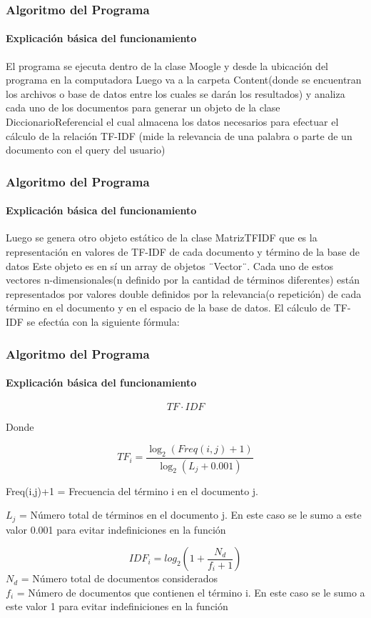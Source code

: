 \documentclass{beamer}
\begin{document}
\begin{frame}
\frametitle{Algoritmo del Programa}
\framesubtitle{Explicación básica del funcionamiento}
El programa se ejecuta dentro de la clase Moogle y desde la ubicación del programa en la computadora
Luego va a la carpeta Content(donde se encuentran los archivos o base de datos entre los cuales se darán los resultados) y analiza cada uno de los documentos para generar un objeto de la clase DiccionarioReferencial el cual almacena los datos necesarios para efectuar el cálculo de la relación TF-IDF (mide la relevancia de una palabra o parte de un documento con el query del usuario)
\end{frame}

\begin{frame}
\frametitle{Algoritmo del Programa}
\framesubtitle{Explicación básica del funcionamiento}
Luego se genera otro objeto estático de la clase MatrizTFIDF que es la representación en valores de TF-IDF de cada documento y término de la base de datos
Este objeto es en sí un array de objetos ¨Vector¨. Cada uno de estos vectores n-dimensionales(n definido por la cantidad de términos diferentes) están representados por valores double definidos por la relevancia(o repetición) de cada término en el documento y en el espacio de la base de datos.
El cálculo de TF-IDF se efectúa con la siguiente fórmula:
\end{frame}

\begin{frame}
\frametitle{Algoritmo del Programa}
\framesubtitle{Explicación básica del funcionamiento}
\begin{equation}\label{eq:TF*IDF}
TF\cdot IDF
\end{equation}

Donde 

\begin{equation}\label{eq:TF}
TF_{i}=\frac{\log_{2}(Freq(i,j)+1)}{\log_{2}(L_{j}+0.001)}
\end{equation}

Freq(i,j)+1 = Frecuencia del término i en el documento j.

$L_{j}$ = Número total de términos en el documento j. En este caso se le sumo a este valor 0.001 para evitar indefiniciones en la función 

\begin{equation}\label{eq:IDF}
IDF_{i} = log_{2}(1+\frac{N_{d}}{f_{i}+1})
\end{equation}
$N_{d}$ = Número total de documentos considerados\\
$f_{i}$ = Número de documentos que contienen el término i. En este caso se le sumo a este valor 1 para evitar indefiniciones en la función 
\end{frame}
\end{document}
